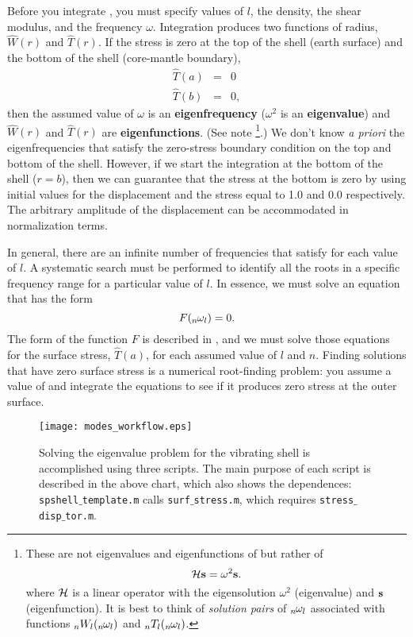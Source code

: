 \documentclass[11pt,titlepage,fleqn]{article}
\newcommand{\Tnl}{\mbox{${}_nT_l$}}
\newcommand{\Wnl}{\mbox{${}_nW_l$}}
\newcommand{\omnl}{\mbox{${}_{n\hspace{-0.2 mm}}\omega_l$}}
\begin{document}
Before you integrate , you must specify values of $l$, the density, the shear modulus, and the frequency $\omega$. Integration produces two functions of radius, $\hat{W}(r)$ and $\hat{T}(r)$. If the stress is zero at the top of the shell (earth surface) and the bottom of the shell (core-mantle boundary),
%
\begin{eqnarray}
\hat{T}(a) &=& 0
\\
\hat{T}(b) &=& 0,
\end{eqnarray}
%
then the assumed value of $\omega$ is an {\bf eigenfrequency} ($\omega^2$ is an {\bf eigenvalue}) and  $\hat{W}(r)$ and $\hat{T}(r)$ are {\bf eigenfunctions}.
(See note \footnote{These are not eigenvalues and eigenfunctions of  but rather of \citep[][Eq.~4.8-4.9]{DT}
%
\begin{equation*}
{\boldmath \cal H} \mbox{${\bf s}$} = \omega^2 \mbox{${\bf s}$}.
\end{equation*}
%
where ${\boldmath \cal H}$ is a linear operator with the eigensolution $\omega^2$ (eigenvalue) and $\mbox{${\bf s}$}$ (eigenfunction). It is best to think of {\em solution pairs} of $\omnl$ associated with functions $\Wnl(\omnl)$ and $\Tnl(\omnl)$.}.)
We don't know {\em a priori} the eigenfrequencies that satisfy the zero-stress boundary condition on the top and bottom of the shell. However, if we start the integration at the bottom of the shell ($r = b$), then we can guarantee that the stress at the bottom is zero by using initial values for the displacement and the stress equal to 1.0 and 0.0 respectively. The arbitrary amplitude of the displacement can be accommodated in normalization terms.

In general, there are an infinite number of frequencies that satisfy  for each value of $l$. A systematic search must be performed to identify all the roots in a specific frequency range for a particular value of $l$. In essence, we must solve an equation that has the form
%
\begin{equation}
F(\omnl) = 0.
\end{equation}
%
The form of the function $F$ is described in , and we must solve those equations for the surface stress, $\hat{T}(a)$, for each assumed value of $l$ and $n$. Finding solutions that have zero surface stress is a numerical root-finding problem: you assume a value of and integrate the equations to see if it produces zero stress at the outer surface.


\begin{figure}[h]
\centering
\texttt{[image: modes\_workflow.eps]}
\caption[]
{{
Solving the eigenvalue problem for the vibrating shell is accomplished using three scripts. The main purpose of each script is described in the above chart, which also shows the dependences: {\tt spshell$\_$template.m} calls {\tt surf$\_$stress.m}, which requires {\tt stress$\_$disp$\_$tor.m}.
\label{fig:workflow}
}}
\end{figure}
\end{document}
